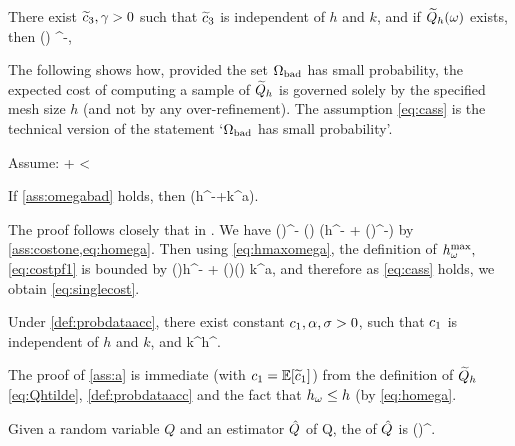 \label{ass:costone}
There exist $\widetilde{c}_{3}, \gamma > 0$ such that $\widetilde{c}_{3}$ is independent of $h$ and $k$, and if $\widetilde{Q}_{h}(\omega)$ exists, then
\beqs
\Cost{\Qhtilde(\omega)} \leq \cthtilde(\omega) \homega^{-\gamma},
\eeqs
\eas

The following  shows how, provided the set $\Omega_{\mathrm{bad}}$ has small probability, the expected cost of computing a sample of $\widetilde{Q}_{h}$ is governed solely by the specified mesh size $h$ (and not by any over-refinement). The assumption \cref{eq:cass} is the technical version of the statement `$\Omega_{\mathrm{bad}}$ has small probability'.

\label{ass:omegabad}
Assume:
\beq\label{eq:cass}
\cth \de \EXP{\cthtilde}+ \EXP{\cthtilde\Co^{-\gamma}} < \infty
\eeq
\eas

\label{lem:c}
If \cref{ass:omegabad} holds, then 
\beq\label{eq:singlecost}
\EXP{\Cost{\Qh}} \leq \cth \mleft(h^{-\gamma}+k^{a\gamma}\mright).
\eeq
\ele

The proof follows closely that in \cite[Lemma 5.8]{GrPaSc:19}.
We have
\beq\label{eq:costpf1}
\Cost{\uhtilde(\omega)} \leq \cthtilde(\omega)\homega^{-\gamma} \leq \cthtilde(\omega) \mleft(h^{-\gamma} + \mleft(\hmaxomega\mright)^{-\gamma}\mright)
\eeq
by \cref{ass:costone,eq:homega}. Then using \cref{eq:hmaxomega}, the definition of $h^{\max}_{\omega},$ \cref{eq:costpf1} is bounded by
\beq\label{eq:costpf2}
\cthtilde(\omega)h^{-\gamma} + \mleft(\cthtilde\Co\mright)(\omega) k^{a\gamma},
\eeq
and therefore as \cref{eq:cass} holds, we obtain \cref{eq:singlecost}.
\epf

\label{ass:a}
Under \cref{def:probdataacc}, there exist constant $c_{1}, \alpha, \sigma> 0$, such that $c_{1}$ is independent of $h$ and $k$, and
\beqs
{} \leq \co k^\sigma h^{\alpha}.
\eeqs
\ele

The proof of \cref{ass:a} is immediate (with $\co = \EXP{\cotilde}$) from the definition of $\widetilde{Q}_{h}$ \cref{eq:Qhtilde}, \cref{def:probdataacc} and the fact that $h_{\omega} \leq h$ (by \cref{eq:homega}.
\epf

\label{def:rmse}
Given a random variable $Q$ and an estimator $\hat{Q}$ of Q, the  of $\hat{Q}$ is
\beqs
\err{\Qhat} \de \mleft(\mright)^{\half}.
\eeqs
\ede


